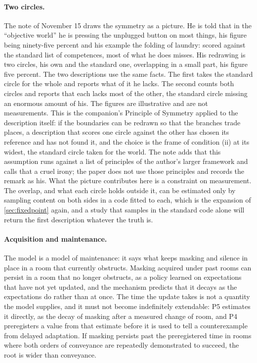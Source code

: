 \paragraph{Two circles.} The note of November 15 draws the symmetry as a picture. He is told that in the ``objective world'' he is pressing the unplugged button on most things, his figure being ninety-five percent and his example the folding of laundry: scored against the standard list of competences, most of what he does misses. His redrawing is two circles, his own and the standard one, overlapping in a small part, his figure five percent. The two descriptions use the same facts. The first takes the standard circle for the whole and reports what of it he lacks. The second counts both circles and reports that each lacks most of the other, the standard circle missing an enormous amount of his. The figures are illustrative and are not measurements. This is the companion's Principle of Symmetry \cite{NormCost} applied to the description itself: if the boundaries can be redrawn so that the branches trade places, a description that scores one circle against the other has chosen its reference and has not found it, and the choice is the frame of condition (ii) at its widest, the standard circle taken for the world. The note adds that this assumption runs against a list of principles of the author's larger framework \cite{Aethus} and calls that a cruel irony; the paper does not use those principles and records the remark as his. What the picture contributes here is a constraint on measurement. The overlap, and what each circle holds outside it, can be estimated only by sampling content on both sides in a code fitted to each, which is the expansion of \autoref{sec:fixedpoint} again, and a study that samples in the standard code alone will return the first description whatever the truth is.

\paragraph{Acquisition and maintenance.} The model is a model of maintenance: it says what keeps masking and silence in place in a room that currently obstructs. Masking acquired under past rooms can persist in a room that no longer obstructs, as a policy learned on expectations that have not yet updated, and the mechanism predicts that it decays as the expectations do rather than at once. The time the update takes is not a quantity the model supplies, and it must not become indefinitely extendable: P5 estimates it directly, as the decay of masking after a measured change of room, and P4 preregisters a value from that estimate before it is used to tell a counterexample from delayed adaptation. If masking persists past the preregistered time in rooms where both orders of conveyance are repeatedly demonstrated to succeed, the root is wider than conveyance.

